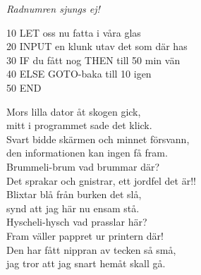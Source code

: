 \documentclass[a6paper, 10pt, twoside]{article}
\begin{document}
\noindent
\begin{center}
\textit{Radnumren sjungs ej!}
\end{center}
\begin{lyrics}
10 LET oss nu fatta i våra glas\\
20 INPUT en klunk utav det som där has\\
30 IF du fått nog THEN till 50 min vän\\
40 ELSE GOTO-baka till 10 igen\\
50 END
\end{lyrics}
\vspace{30pt}
\begin{center}
\end{center}
\begin{lyrics}
Mors lilla dator åt skogen gick, \\
mitt i programmet sade det klick. \\
Svart bidde skärmen och minnet försvann, \\
den informationen kan ingen få fram. 
\vspace{5pt} \\
Brummeli-brum vad brummar där? \\
Det sprakar och gnistrar, ett jordfel det är!! \\
Blixtar blå från burken det slå, \\
synd att jag här nu ensam stå. 
\vspace{5pt} \\
Hyscheli-hysch vad prasslar här? \\
Fram väller pappret ur printern där! \\
Den har fått nippran av tecken så små, \\
jag tror att jag snart hemåt skall gå. 
\end{lyrics}
\end{document}
